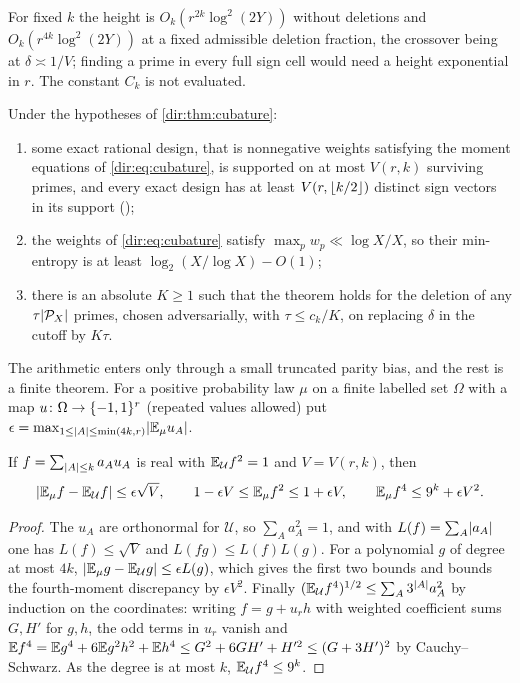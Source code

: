 For fixed $k$ the height is $O_k(r^{2k}\log^2(2Y))$ without deletions and $O_k(r^{4k}\log^2(2Y))$ at a fixed
admissible deletion fraction, the crossover being at $\delta\asymp1/V$; finding a prime in every full sign
cell would need a height exponential in $r$. The constant $C_k$ is not evaluated.

\begin{corollary}\label{dir:cor:cubature}
Under the hypotheses of \cref{dir:thm:cubature}:
\begin{enumerate}[label=\textup{(\alph*)}]
\item some exact rational design, that is nonnegative weights satisfying the moment equations of
\eqref{dir:eq:cubature}, is supported on at most $V(r,k)$ surviving primes, and every exact design has at least
$V(r,\lfloor k/2\rfloor)$ distinct sign vectors in its support \textup{(}\stU\textup{)};
\item the weights of \eqref{dir:eq:cubature} satisfy $\max_pw_p\ll\log X/X$, so their min-entropy is at least
$\log_2(X/\log X)-O(1)$;
\item there is an absolute $K\ge1$ such that the theorem holds for the deletion of any $\tau\lvert\mathcal P_X\rvert$
primes, chosen adversarially, with $\tau\le c_k/K$, on replacing $\delta$ in the cutoff by $K\tau$.
\end{enumerate}
\end{corollary}

The arithmetic enters only through a small truncated parity bias, and the rest is a finite theorem. For a
positive probability law $\mu$ on a finite labelled set $\Omega$ with a map $u\colon\Omega\to\{-1,1\}^r$
(repeated values allowed) put $\epsilon=\max_{1\le\lvert A\rvert\le\min(4k,r)}\lvert\mathbb{E}_\mu u_A\rvert$.

\begin{lemma}\label{dir:lem:cubnorms}
If $f=\sum_{\lvert A\rvert\le k}a_Au_A$ is real with $\mathbb{E}_{\mathcal U}f^2=1$ and $V=V(r,k)$, then
\[
 \lvert\mathbb{E}_\mu f-\mathbb{E}_{\mathcal U}f\rvert\le\epsilon\sqrt V,\qquad 1-\epsilon V\le\mathbb{E}_\mu f^2\le1+\epsilon V,\qquad
 \mathbb{E}_\mu f^4\le9^k+\epsilon V^2 .
\]
\end{lemma}

\begin{proof}
The $u_A$ are orthonormal for $\mathcal U$, so $\sum_Aa_A^2=1$, and with $L(f)=\sum_A\lvert a_A\rvert$ one has
$L(f)\le\sqrt V$ and $L(fg)\le L(f)L(g)$. For a polynomial $g$ of degree at most $4k$,
$\lvert\mathbb{E}_\mu g-\mathbb{E}_{\mathcal U}g\rvert\le\epsilon L(g)$, which gives the first two bounds and bounds the
fourth-moment discrepancy by $\epsilon V^2$. Finally $(\mathbb{E}_{\mathcal U}f^4)^{1/2}\le\sum_A3^{\lvert A\rvert}a_A^2$ by
induction on the coordinates: writing $f=g+u_rh$ with weighted coefficient sums $G,H'$ for $g,h$, the odd
terms in $u_r$ vanish and
$\mathbb{E} f^4=\mathbb{E} g^4+6\mathbb{E} g^2h^2+\mathbb{E} h^4\le G^2+6GH'+H'^2\le(G+3H')^2$ by Cauchy--Schwarz. As the degree
is at most $k$, $\mathbb{E}_{\mathcal U}f^4\le9^k$.
\end{proof}

